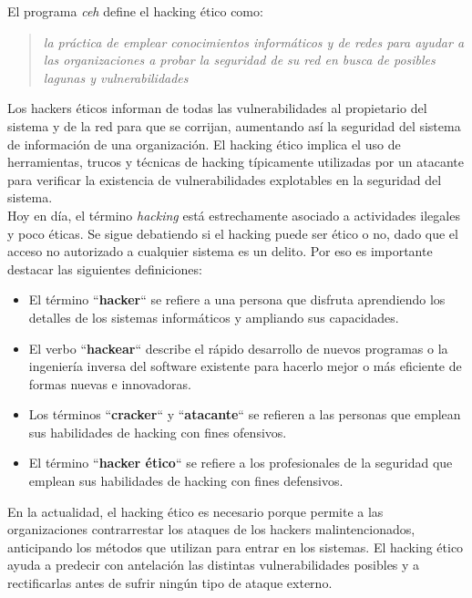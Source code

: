 El programa \textit{\acrfull{ceh}} define el hacking ético como:

\begin{quote}
    \textit{la práctica de emplear conocimientos informáticos y de redes para ayudar a las organizaciones a probar la seguridad de su red en busca de posibles lagunas y vulnerabilidades}
\end{quote}

Los hackers éticos informan de todas las vulnerabilidades al propietario del sistema y de la red para que se corrijan, aumentando así la seguridad del sistema de información de una organización. El hacking ético implica el uso de herramientas, trucos y técnicas de hacking típicamente utilizadas por un atacante para verificar la existencia de vulnerabilidades explotables en la seguridad del sistema.\\

Hoy en día, el término \textit{hacking} está estrechamente asociado a actividades ilegales y poco éticas. Se sigue debatiendo si el hacking puede ser ético o no, dado que el acceso no autorizado a cualquier sistema es un delito. Por eso es importante destacar las siguientes definiciones:

\begin{itemize}
    \item El término ``\textbf{hacker}`` se refiere a una persona que disfruta aprendiendo los detalles de los sistemas informáticos y ampliando sus capacidades.
    \item El verbo ``\textbf{hackear}`` describe el rápido desarrollo de nuevos programas o la ingeniería inversa del software existente para hacerlo mejor o más eficiente de formas nuevas e innovadoras.
    \item Los términos ``\textbf{cracker}`` y ``\textbf{atacante}`` se refieren a las personas que emplean sus habilidades de hacking con fines ofensivos.
    \item El término ``\textbf{hacker ético}`` se refiere a los profesionales de la seguridad que emplean sus habilidades de hacking con fines defensivos.
\end{itemize}

En la actualidad, el hacking ético es necesario porque permite a las organizaciones contrarrestar los ataques de los hackers malintencionados, anticipando los métodos que utilizan para entrar en los sistemas. El hacking ético ayuda a predecir con antelación las distintas vulnerabilidades posibles y a rectificarlas antes de sufrir ningún tipo de ataque externo.



